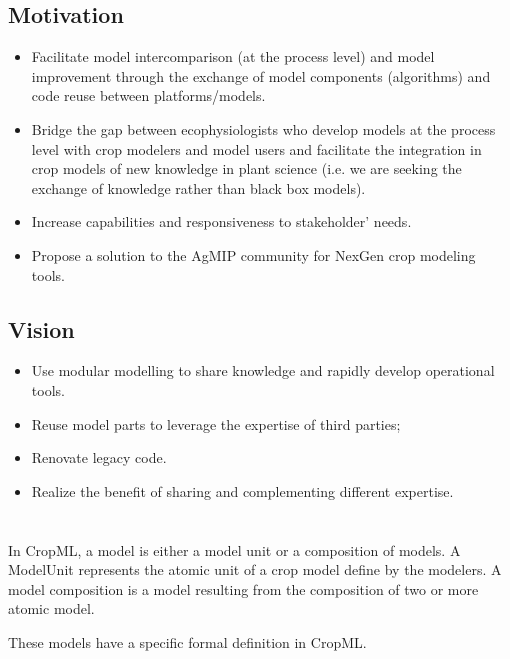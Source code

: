 \documentclass[letterpaper,10pt,english]{sphinxmanual}
\begin{document}
\subsection{Motivation}
\label{\detokenize{user/overview:motivation}}\begin{itemize}
\item {} 
Facilitate model intercomparison (at the process level) and model improvement through the exchange of model components (algorithms) and code reuse between platforms/models.

\item {} 
Bridge the gap between ecophysiologists who develop models at the process level with crop modelers and model users and facilitate the integration in crop models of new knowledge in plant science (i.e. we are seeking the exchange of knowledge rather than black box models).

\item {} 
Increase capabilities and responsiveness to stakeholder’ needs.

\item {} 
Propose a solution to the AgMIP community for NexGen crop modeling tools.

\end{itemize}


\subsection{Vision}
\label{\detokenize{user/overview:vision}}\begin{itemize}
\item {} 
Use modular modelling to share knowledge and rapidly develop operational tools.

\item {} 
Reuse model parts to leverage the expertise of third parties;

\item {} 
Renovate legacy code.

\item {} 
Realize the benefit of sharing and complementing different expertise.

\end{itemize}


\section{}
\label{\detokenize{user/description:cropml-description}}\label{\detokenize{user/description::doc}}
\begin{DUlineblock}{0em}
\item[] In CropML, a model is either a model unit or a composition of models. A ModelUnit  represents the atomic unit of a crop model define by the
modelers. A model composition  is a model resulting from the composition of two or more atomic model.
\item[] These models have a specific formal definition in CropML.
\end{DUlineblock}
\end{document}
